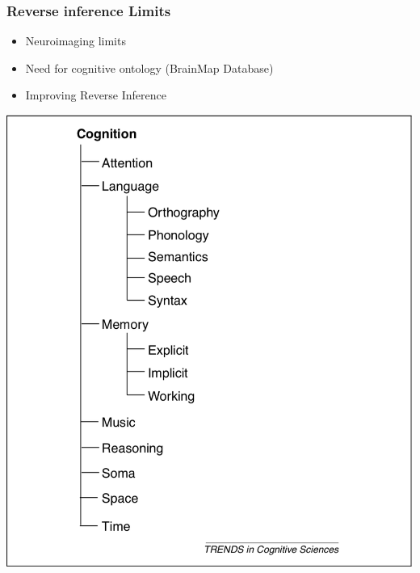 \documentclass{beamer}
\begin{document}
\begin{frame}
\frametitle{Reverse inference Limits}
\begin{minipage}{.50\linewidth}
\begin{itemize}
\item Neuroimaging limits
\item Need for cognitive ontology 
(BrainMap Database)
\item Improving Reverse Inference
\end{itemize}
\end{minipage}
\hfill
\begin{minipage}{.45\linewidth}
\centering
\includegraphics[scale=0.27]{BrainMapp.png}
\end{minipage}
\end{frame}
\end{document}
